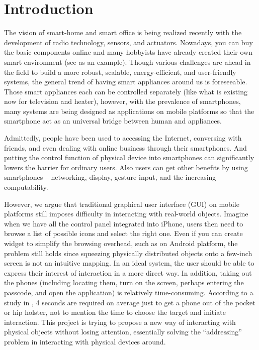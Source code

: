 \section{Introduction}
\label{sec:introduction}

The vision of smart-home and smart office is being realized recently with the development of radio technology, sensors, and actuators. Nowadays, you can buy the basic components online \cite{SmartHome, NinjaBlocks} and many hobbyists have already created their own smart environment (see \cite{BRAD} as an example). Though various challenges are ahead in the field to build a more robust, scalable, energy-efficient, and user-friendly systems, the general trend of having smart appliances around us is foreseeable. Those smart appliances each can be controlled separately (like what is existing now for television and heater), however, with the prevalence of smartphones, many systems \cite{SmartThings, Lockitron} are being designed as applications on mobile platforms so that the smartphone act as an universal bridge between human and appliances.

Admittedly, people have been used to accessing the Internet, conversing with friends, and even dealing with online business through their smartphones. And putting the control function of physical device into smartphones can significantly lowers the barrier for ordinary users. Also users can get other benefits by using smartphones -- networking,  display, gesture input, and the increasing computability. 

However, we argue that traditional graphical user interface (GUI) on mobile platforms still imposes difficulty in interacting with real-world objects. Imagine when we have all the control panel integrated into iPhone, users then need to browse a list of possible icons and select the right one. Even if you can create widget to simplify the browsing overhead, such as on Android platform, the problem still holds since squeezing physically distributed objects onto a few-inch screen is not an intuitive mapping. In an ideal system, the user should be able to express their interest of interaction in a more direct way. In addition, taking out the phones (including locating them, turn on the screen, perhaps entering the passcode, and open the application) is relatively time-consuming. According to a study in \cite{Ashbrook:2008:QIM:1357054.1357092}, 4 seconds are required on average just to get a phone out of the pocket or hip holster, not to mention the time to choose the target and initiate interaction. This project is trying to propose a new way of interacting with physical objects without losing attention, essentially solving the ``addressing'' problem in interacting with physical devices around.

